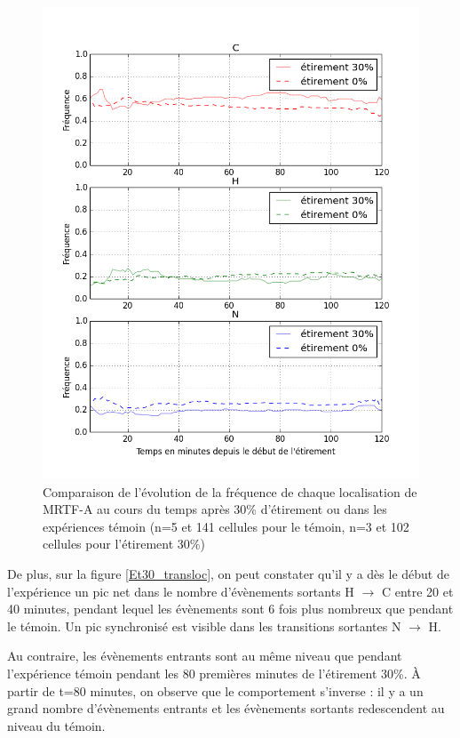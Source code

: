\documentclass{report}
\begin{document}
\begin{figure}
\includegraphics[scale=0.5]{Figures/Etirement30_vs_0_dynamique.png} 
\caption{\label{Et30_CHN} Comparaison de l'évolution de la fréquence de chaque localisation de MRTF-A au cours du temps après 30\% d'étirement ou dans les expériences témoin (n=5 et 141 cellules pour le témoin, n=3 et 102 cellules pour l'étirement 30\%)}
\end{figure}

De plus, sur la figure \ref{Et30_transloc}, on peut constater qu'il y a dès le début de l'expérience un pic net dans le nombre d'évènements sortants H $\rightarrow$ C entre 20 et 40 minutes, pendant lequel les évènements sont 6 fois plus nombreux que pendant le témoin. Un pic synchronisé est visible dans les transitions sortantes N $\rightarrow$ H. 

Au contraire, les évènements entrants sont au même niveau que pendant l'expérience témoin pendant les 80 premières minutes de l'étirement 30\%. À partir de t=80 minutes, on observe que le comportement s'inverse : il y a un grand nombre d'évènements entrants et les évènements sortants redescendent au niveau du témoin. 
\end{document}
